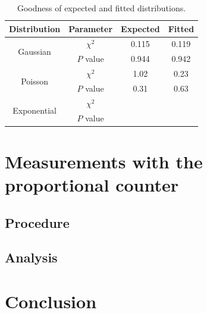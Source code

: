 \begin{table}[H]
	\renewcommand{\arraystretch}{1.5}
	\centering
	\begin{tabular}{|c|c|c|c|}
		\hline
		Distribution & Parameter & Expected & Fitted \\
		\hline
		\multirow{2}{*}{Gaussian} & $\chi^2$ & \SI{0.115}{} & \SI{0.119}{} \\
		 & $P$ value & \SI{0.944}{} & \SI{0.942}{} \\
		\hline
		\multirow{2}{*}{Poisson} & $\chi^2$ & \SI{1.02}{} & \SI{0.23}{} \\
		 & $P$ value & \SI{0.31}{} & \SI{0.63}{} \\
		\hline
		\multirow{2}{*}{Exponential} & $\chi^2$ & \SI{}{} & \SI{}{} \\
		 & $P$ value & \SI{}{} & \SI{}{} \\
		\hline
	\end{tabular}
	\caption{Goodness of expected and fitted distributions.}
	\label{tab:DistGood}
\end{table}

\section{Measurements with the proportional counter}

\subsection{Procedure}

\subsection{Analysis}

\section{Conclusion}




